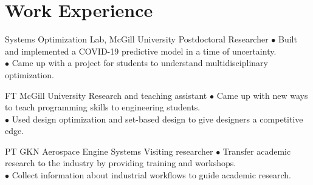 \documentclass[10pt]{article} %
\begin{document}

\section{Work Experience}





{} %
{Systems Optimization Lab, McGill University} %
{Postdoctoral Researcher} %
{
	$\bullet$ Built and implemented a COVID-19 predictive model in a time of uncertainty.\\
	$\bullet$ Came up with a project for students to understand multidisciplinary optimization.
} %


{FT} %
{McGill University} %
{Research and teaching assistant} %
{
	$\bullet$ Came up with new ways to teach programming skills to engineering students.\\
	$\bullet$ Used design optimization and set-based design to give designers a competitive edge.
}  %


{PT} %
{GKN Aerospace Engine Systems} %
{Visiting researcher} %
{
	$\bullet$ Transfer academic research to the industry by providing training and workshops.\\
	$\bullet$ Collect information about industrial workflows to guide academic research.
}  %


\vspace{-\baselineskip} %
\end{document}
